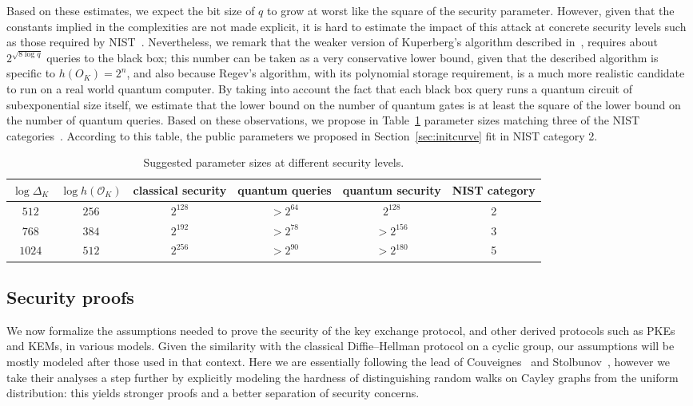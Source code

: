 \documentclass{article}
\renewcommand{\O}{\mathcal{O}}
\theoremstyle{definition}
\begin{document}
Based on these estimates, we expect the bit size of $q$ to grow at
worst like the square of the security parameter. However, given that
the constants implied in the complexities are not made explicit, it is
hard to estimate the impact of this attack at concrete security levels
such as those required by NIST~\cite{NIST2016}. Nevertheless, we
remark that the weaker version of Kuperberg's algorithm described
in~\cite[§2.1]{regev04}, requires about $2^{\sqrt{8\log q}}$ queries
to the black box; this number can be taken as a very conservative
lower bound, given that the described algorithm is specific to
$h(O_K)=2^n$, and also because Regev's algorithm, with its polynomial
storage requirement, is a much more realistic candidate to run on a
real world quantum computer. By taking into account the fact that each
black box query runs a quantum circuit of subexponential size itself,
we estimate that the lower bound on the number of quantum gates is at
least the square of the lower bound on the number of quantum
queries. Based on these observations, we propose in
Table~\ref{tab:sizes} parameter sizes matching three of the NIST
categories~\cite{NIST2016}.
According to this table, the public parameters we proposed
in Section~\ref{sec:initcurve} fit in NIST category 2.

\begin{table}
  \renewcommand{\arraystretch}{1.4}
  \centering
  \begin{tabular}{c | c | c | c | c | c}
    $\log Δ_K$ & $\log h(\O_K)$
    & \parbox{10ex}{\centering classical security}
    & \parbox{10ex}{\centering quantum queries}
    & \parbox{10ex}{\centering quantum security}
    & \parbox{10ex}{\centering NIST category}\\
    \hline
    $512$  & $256$ & $2^{128}$ & $> 2^{64}$ & $2^{128}$ & 2\\
    $768$  & $384$ & $2^{192}$ & $> 2^{78}$ & $> 2^{156}$ & 3\\
    $1024$ & $512$ & $2^{256}$ & $> 2^{90}$ & $> 2^{180}$ & 5
  \end{tabular}
  \caption{Suggested parameter sizes at different security levels.}
  \label{tab:sizes}
\end{table}

\subsection{Security proofs}
\label{sec:proofs}

We now formalize the assumptions needed to prove the security of the
key exchange protocol, and other derived protocols such as PKEs and
KEMs, in various models. Given the similarity with the classical
Diffie--Hellman protocol on a cyclic group, our assumptions will be
mostly modeled after those used in that context. Here we are
essentially following the lead of
Couveignes~\cite{cryptoeprint:2006:291} and
Stolbunov~\cite{Stol,Stolbunov2012}, however we take their analyses a
step further by explicitly modeling the hardness of distinguishing
random walks on Cayley graphs from the uniform distribution: this
yields stronger proofs and a better separation of security concerns.
\end{document}
